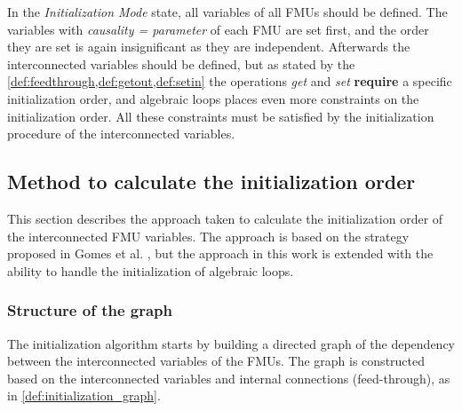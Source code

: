 In the \textit{Initialization Mode} state, all variables of all FMUs should be defined.
The variables with \textit{causality = parameter} of each FMU are set first, and the order they are set is again insignificant as they are independent.
Afterwards the interconnected variables should be defined, but as stated by the \cref{def:feedthrough,def:getout,def:setin} the operations \textit{get} and \textit{set} \textbf{require} a specific initialization order, and algebraic loops places even more constraints on the initialization order. All these constraints must be satisfied by the initialization procedure of the interconnected variables.

\subsection{Method to calculate the initialization order}
This section describes the approach taken to calculate the initialization order of the interconnected FMU variables. The approach is based on the strategy proposed in Gomes et al. \cite{Gomes2019b, BromanCompositionCo-Simulation}, but the approach in this work is extended with the ability to handle the initialization of algebraic loops. 

\subsubsection{Structure of the graph}
The initialization algorithm starts by building a directed graph of the dependency between the interconnected variables of the FMUs. The graph is constructed based on the interconnected variables and internal connections (feed-through), as in \cref{def:initialization_graph}. 

